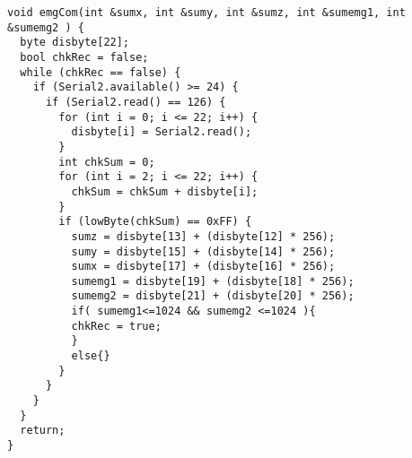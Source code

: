 \begin{lstlisting}[frame=single,language=Arduino] 
void emgCom(int &sumx, int &sumy, int &sumz, int &sumemg1, int &sumemg2 ) {
  byte disbyte[22];
  bool chkRec = false;
  while (chkRec == false) {
    if (Serial2.available() >= 24) {
      if (Serial2.read() == 126) {
        for (int i = 0; i <= 22; i++) {
          disbyte[i] = Serial2.read();
        }
        int chkSum = 0;
        for (int i = 2; i <= 22; i++) {
          chkSum = chkSum + disbyte[i];
        }
        if (lowByte(chkSum) == 0xFF) {
          sumz = disbyte[13] + (disbyte[12] * 256);
          sumy = disbyte[15] + (disbyte[14] * 256);
          sumx = disbyte[17] + (disbyte[16] * 256);
          sumemg1 = disbyte[19] + (disbyte[18] * 256);
          sumemg2 = disbyte[21] + (disbyte[20] * 256);
          if( sumemg1<=1024 && sumemg2 <=1024 ){
          chkRec = true;
          }
          else{}
        }
      }
    }
  }
  return;
}
\end{lstlisting}